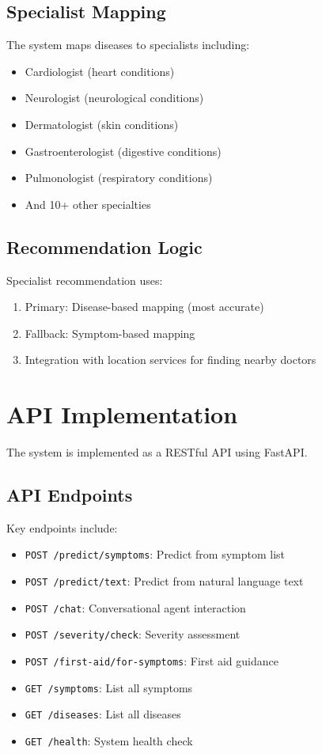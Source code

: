 \subsection{Specialist Mapping}
The system maps diseases to specialists including:

\begin{itemize}
    \item Cardiologist (heart conditions)
    \item Neurologist (neurological conditions)
    \item Dermatologist (skin conditions)
    \item Gastroenterologist (digestive conditions)
    \item Pulmonologist (respiratory conditions)
    \item And 10+ other specialties
\end{itemize}

\subsection{Recommendation Logic}
Specialist recommendation uses:

\begin{enumerate}
    \item Primary: Disease-based mapping (most accurate)
    \item Fallback: Symptom-based mapping
    \item Integration with location services for finding nearby doctors
\end{enumerate}

\section{API Implementation}
The system is implemented as a RESTful API using FastAPI.

\subsection{API Endpoints}
Key endpoints include:

\begin{itemize}
    \item \texttt{POST /predict/symptoms}: Predict from symptom list
    \item \texttt{POST /predict/text}: Predict from natural language text
    \item \texttt{POST /chat}: Conversational agent interaction
    \item \texttt{POST /severity/check}: Severity assessment
    \item \texttt{POST /first-aid/for-symptoms}: First aid guidance
    \item \texttt{GET /symptoms}: List all symptoms
    \item \texttt{GET /diseases}: List all diseases
    \item \texttt{GET /health}: System health check
\end{itemize}

